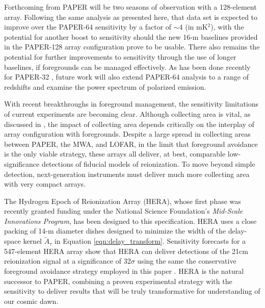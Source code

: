 \documentclass[twocolumn,numberedappendix]{emulateapj} \shorttitle{New Limits on the 21 cm Power Spectrum at $z=8.4$}
\begin{document}
Forthcoming from PAPER will be two seasons of observation with a 128-element array.
Following the same analysis as presented here, that data set is expected to improve 
over the PAPER-64 sensitivity by a factor of $\sim$4 (in mK$^2$), with the potential for another boost to sensitivity
should the new 16-m baselines provided in the PAPER-128 array configuration prove to be
usable.  There also remains the potential for further improvements to sensitivity through the
use of longer baselines, if foregrounds can be managed effectively.
As has been done recently for PAPER-32 \citep{jacobs_et_al2014,moore_et_al2015}, 
future work will also extend PAPER-64 analysis
to a range of redshifts and examine the power spectrum of polarized emission.



With recent breakthroughs in foreground management, the sensitivity 
limitations of current experiments are becoming clear.  Although collecting area is vital,
as discussed in \citet{pober_et_al2014}, the impact of collecting area
depends critically on the interplay of array configuration with foregrounds.
Despite a large spread in collecting areas between PAPER, the MWA, and LOFAR,
in the limit that foreground avoidance is the only viable strategy, these
arrays all deliver, at best, comparable low-significance detections of fiducial models
of reionization.  To move beyond simple detection, next-generation instruments must
deliver much more collecting area with very compact arrays.

The Hydrogen Epoch of Reionization Array (HERA), whose first phase was recently granted funding
under the National Science Foundation's {\it Mid-Scale Innovations Program}, has been
designed to this specification. HERA uses a close packing of 14-m diameter 
dishes designed to minimize the width of the delay-space kernel
$\tilde{A}_\tau$ in Equation \eqref{eqn:delay_transform}.
Sensitivity forecasts for a 547-element HERA array
show that HERA can deliver detections of the 21cm reionization signal
at a significance of 32$\sigma$ using the same the conservative 
foreground avoidance strategy employed in this paper
\citet{pober_et_al2014}.  HERA is the natural successor
to PAPER, combining a proven experimental strategy with the 
sensitivity to deliver results that will be truly transformative for
understanding of our cosmic dawn.
\end{document}
